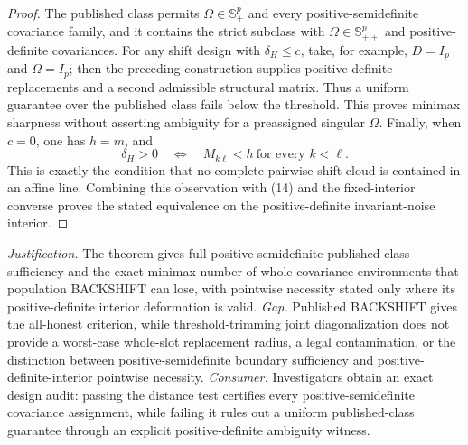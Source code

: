 \documentclass{article}
\begin{document}
\begin{proof}
The published class permits \(\Omega\in\mathbb S_+^p\) and every positive-semidefinite covariance family, and it contains the strict subclass with \(\Omega\in\mathbb S_{++}^p\) and positive-definite covariances.  For any shift design with \(\delta_H\le c\), take, for example, \(D=I_p\) and \(\Omega=I_p\); then the preceding construction supplies positive-definite replacements and a second admissible structural matrix.  Thus a uniform guarantee over the published class fails below the threshold.  This proves minimax sharpness without asserting ambiguity for a preassigned singular \(\Omega\).  Finally, when \(c=0\), one has \(h=m\), and
\[
 \delta_H>0
 \quad\Longleftrightarrow\quad
 M_{k\ell}<h\ \text{for every }k<\ell.
\]
This is exactly the condition that no complete pairwise shift cloud is contained in an affine line.  Combining this observation with (14) and the fixed-interior converse proves the stated equivalence on the positive-definite invariant-noise interior.
\end{proof}
\par\smallskip\noindent \textit{Justification.} The theorem gives full positive-semidefinite published-class sufficiency and the exact minimax number of whole covariance environments that population BACKSHIFT can lose, with pointwise necessity stated only where its positive-definite interior deformation is valid. \textit{Gap.} Published BACKSHIFT gives the all-honest criterion, while threshold-trimming joint diagonalization does not provide a worst-case whole-slot replacement radius, a legal contamination, or the distinction between positive-semidefinite boundary sufficiency and positive-definite-interior pointwise necessity. \textit{Consumer.} Investigators obtain an exact design audit: passing the distance test certifies every positive-semidefinite covariance assignment, while failing it rules out a uniform published-class guarantee through an explicit positive-definite ambiguity witness.
\end{document}
